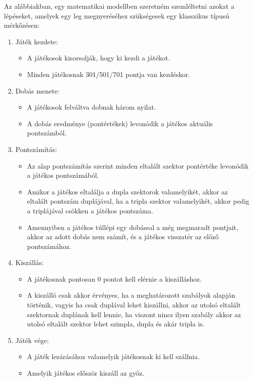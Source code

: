 
Az alábbiakban, egy matematikai modellben szeretném szemléltetni azokat a lépéseket, amelyek egy leg megnyeréséhez szükségesek egy klasszikus típusú mérkőzésen:
\begin{enumerate}
\item Játék kezdete:
\begin{itemize}
\item A játékosok kisorsolják, hogy ki kezdi a játékot. 
\item Minden játékosnak 301/501/701 pontja van kezdéskor.
\end{itemize}
\item Dobás menete:
\begin{itemize}
\item A játékosok felváltva dobnak három nyilat.
\item A dobás eredménye (pontértékek) levonódik a játékos aktuális pontszámból.
\end{itemize}
\item Pontszámítás:
\begin{itemize}
\item Az alap pontszámítás szerint minden eltalált szektor pontértéke levonódik a játékos pontszámából.
\item Amikor a játékos eltalálja a dupla szektorok valamelyikét, akkor az eltalált pontszám duplájával, ha a tripla szektor valamelyikét, akkor pedig a triplájával csökken a játékos pontszáma.
\item Amennyiben a játékos túllépi egy dobással a még megmaradt pontjait, akkor az adott dobás nem számít, és a játékos visszatér az előző pontszámához.
\end{itemize}
\item Kiszállás:
\begin{itemize}
\item A játékosnak pontosan 0 pontot kell elérnie a kiszálláshoz.
\item A kiszálló csak akkor érvényes, ha a meghatározott szabályok alapján történik, vagyis ha csak duplával lehet kiszállni, akkor az utolsó eltalált szektornak duplának kell lennie, ha viszont nincs ilyen szabály akkor az utolsó eltalált szektor lehet szimpla, dupla és akár tripla is.
\end{itemize}
\item Játék vége:
\begin{itemize}
\item A játék lezárásához valamelyik játékosnak ki kell szállnia.
\item Amelyik játékos először kiszáll az győz.
\end{itemize}
\end{enumerate}
